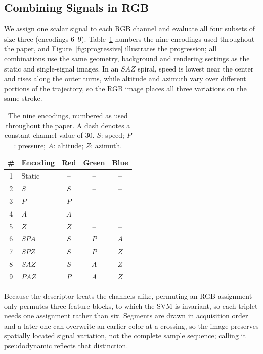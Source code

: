 \subsection{Combining Signals in RGB}
\noindent
We assign one scalar signal to each RGB channel and evaluate all four subsets of size three (encodings 6--9). Table~\ref{tab:encoding} numbers the nine encodings used throughout the paper, and Figure~\ref{fig:progressive} illustrates the progression; all combinations use the same geometry, background and rendering settings as the static and single-signal images. In an $SAZ$ spiral, speed is lowest near the center and rises along the outer turns, while altitude and azimuth vary over different portions of the trajectory, so the RGB image places all three variations on the same stroke.

\begin{table}[t]
\centering\small
\caption{The nine encodings, numbered as used throughout the paper. A dash denotes a constant channel value of 30. $S$: speed; $P$: pressure; $A$: altitude; $Z$: azimuth.}
\label{tab:encoding}
\begin{tabular}{clccc}
\toprule
\# & Encoding & Red & Green & Blue\\
\midrule
1 & Static & -- & -- & --\\
\midrule
2 & $S$ & $S$ & -- & --\\
3 & $P$ & $P$ & -- & --\\
4 & $A$ & $A$ & -- & --\\
5 & $Z$ & $Z$ & -- & --\\
\midrule
6 & $SPA$ & $S$ & $P$ & $A$\\
7 & $SPZ$ & $S$ & $P$ & $Z$\\
8 & $SAZ$ & $S$ & $A$ & $Z$\\
9 & $PAZ$ & $P$ & $A$ & $Z$\\
\bottomrule
\end{tabular}
\end{table}

Because the descriptor treats the channels alike, permuting an RGB assignment only permutes three feature blocks, to which the SVM is invariant, so each triplet needs one assignment rather than six. Segments are drawn in acquisition order and a later one can overwrite an earlier color at a crossing, so the image preserves spatially located signal variation, not the complete sample sequence; calling it pseudodynamic reflects that distinction.
